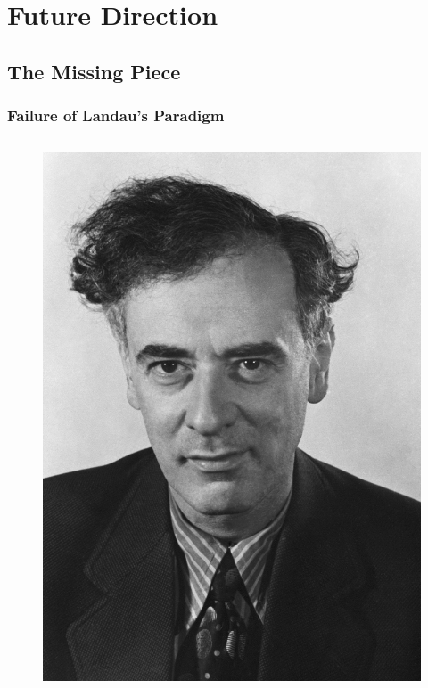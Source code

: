 \documentclass[10pt,aspectratio=43,xcolor=x11names,t]{beamer}%
\begin{document}

\section{Future Direction}
	\subsection{The Missing Piece}
		\begin{frame}\frametitle{Failure of Landau's Paradigm}
			\vspace{-1.5em}
			\begin{columns}
				\begin{column}{0.35\textwidth}
					\begin{figure}[!htp]
						\centering
						\includegraphics[scale=0.06]{Landau.jpg}

\end{figure}
\end{column}
\end{columns}
\end{frame}
\end{document}
